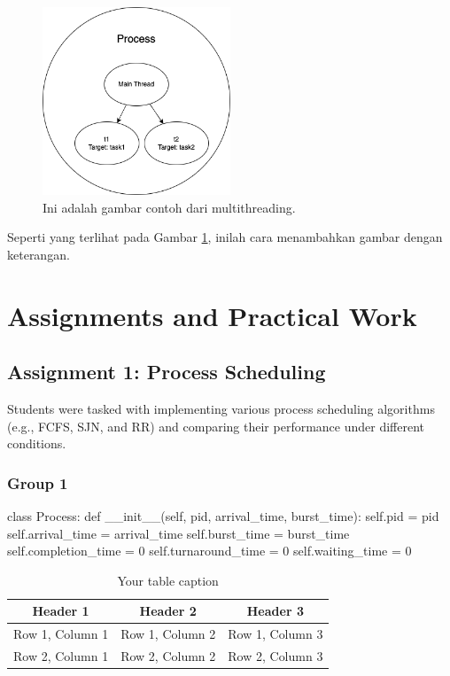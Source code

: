 \documentclass[12pt]{article}
\begin{document}
\begin{figure}[h]
    \centering
    \includegraphics[width=0.5\textwidth]{asset/example.png}  %
    \caption{Ini adalah gambar contoh dari multithreading.}
    \label{fig:contoh_gambar}
\end{figure}

Seperti yang terlihat pada Gambar \ref{fig:contoh_gambar}, inilah cara menambahkan gambar dengan keterangan.

\section{Assignments and Practical Work}
\subsection{Assignment 1: Process Scheduling}
Students were tasked with implementing various process scheduling algorithms (e.g., FCFS, SJN, and RR) and comparing their performance under different conditions.

\subsubsection{Group 1}
\begin{python}
    class Process:
    def __init__(self, pid, arrival_time, burst_time):
        self.pid = pid
        self.arrival_time = arrival_time
        self.burst_time = burst_time
        self.completion_time = 0
        self.turnaround_time = 0
        self.waiting_time = 0
\end{python}

\begin{table}[htbp] %
    \centering
    \begin{tabular}{|c|c|c|} %
    \hline
    Header 1 & Header 2 & Header 3 \\ %
    \hline
    Row 1, Column 1 & Row 1, Column 2 & Row 1, Column 3 \\ %
    \hline
    Row 2, Column 1 & Row 2, Column 2 & Row 2, Column 3 \\ %
    \hline
    \end{tabular}
    \caption{Your table caption} %
    \label{tab:your_label} %
\end{table}
\end{document}
